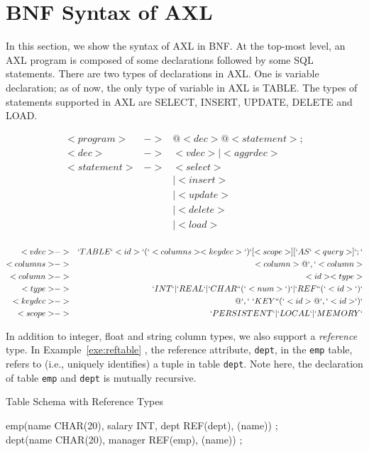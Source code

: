 \chapter{BNF Syntax of AXL}

In this section, we show the syntax of AXL in BNF. At the top-most
level, an AXL program is composed of some declarations followed by
some SQL statements. There are two types of declarations in AXL. One
is variable declaration; as of now, the only type of variable in AXL
is TABLE.  The types of statements supported in AXL are SELECT, INSERT,
UPDATE, DELETE and LOAD.


\begin{bnf}
  \begin{eqnarray*}
    <program> &->& {@ <dec>} {@ <statement> ;} \\
    <dec>  &->& <vdec> | <aggrdec>\\
    <statement> &->& <select> \\
    &&| <insert>\\
    &&| <update>\\
    &&| <delete>\\
    &&| <load>\\
  \end{eqnarray*}
\end{bnf}


\begin{bnf}
  \begin{eqnarray*}
    <vdec> &->& `TABLE` <id> `(` <columns> <keydec> `)` [<scope>] [`AS` <query>] `;`\\
    <columns> &->& <column> {@ `,`  <column>}\\
    <column> &->& <id> <type> \\
    <type> &->& `INT` | `REAL` | `CHAR` `(` <num> `)` |  `REF` `(` <id> `)`\\
    <keydec> &->& {@ `,` \ `KEY` `(` <id> {@ `,` <id>}`)` }\\
    <scope> &->& `PERSISTENT` | `LOCAL` | `MEMORY`
  \end{eqnarray*}
\end{bnf}

In addition to integer, float and string column types, we also support
a {\it reference} type. In Example~\ref{exe:reftable} , the reference
attribute, {\tt dept}, in the {\tt emp} table, refers to (i.e.,
uniquely identifies) a tuple in table {\tt dept}. Note here, the
declaration of table {\tt emp} and {\tt dept} is mutually recursive.

\begin{example}{Table Schema with Reference Types}
\begin{codedisplay}
\>\> emp(name CHAR(20), salary INT, dept REF(dept), (name)) ;\\
\>\> dept(name CHAR(20), manager REF(emp), (name)) ;
\end{codedisplay}
\label{exe:reftable}
\end{example}

